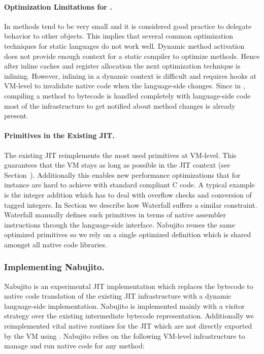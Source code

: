 \paragraph{Optimization Limitations for \PH.}
In \ST methods tend to be very small and it is considered good practice to delegate behavior to other objects.
This implies that several common optimization techniques for static languages do not work well.
Dynamic method activation does not provide enough context for a static compiler to optimize methods.
Hence after inline caches and register allocation the next optimization technique is inlining.
However, inlining in a dynamic context is difficult and requires hooks at VM-level to invalidate native code when the language-side changes.
Since in \PH, compiling a method to bytecode is handled completely with language-side code most of the infrastructure to get notified about method changes is already present.

\paragraph{Primitives in the Existing JIT.}
The existing JIT reimplements the most used primitives at VM-level.
This guarantees that the VM stays as long as possible in the JIT context (see Section~). Additionally this enables new performance optimizations that for instance are hard to achieve with standard compliant C code.
A typical example is the integer addition which has to deal with overflow checks and conversion of tagged integers.
In Section  we describe how Waterfall suffers a similar constraint. Waterfall manually defines such primitives in terms of native assembler instructions through the language-side \B interface.
Nabujito reuses the same optimized primitives so we rely on a single optimized definition which is shared amongst all native code libraries.

\subsubsection{Implementing Nabujito.}
Nabujito is an experimental JIT implementation which replaces the bytecode to native code translation of the existing JIT infrastructure with a dynamic language-side implementation.
Nabujito is implemented mainly with a visitor strategy over the existing intermediate bytecode representation. 
Additionally we reimplemented vital native routines for the JIT which are not directly exported by the VM using \B. 
Nabujito relies on the following VM-level infrastructure to manage and run native code for any \PH method:

